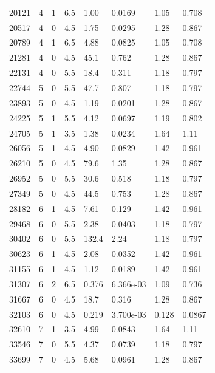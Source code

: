 \documentclass[preview]{standalone}
\begin{document}
{{{\begin{tabular}{L{1.2cm}C{1.2cm} C{0.3cm}C{0.5cm} C{1.4cm}C{1.4cm} C{1.4cm}C{1.4cm}}
  20121  &     4  & 1     & 6.5 &  1.00  & 0.0169  & 1.05 &  0.708   \\ 
  20517  &     4  & 0     & 4.5 &  1.75  & 0.0295  & 1.28 &  0.867   \\ 
  20789  &     4  & 1     & 6.5 &  4.88  & 0.0825  & 1.05 &  0.708   \\ 
  21281  &     4  & 0     & 4.5 &  45.1  & 0.762  & 1.28 &  0.867   \\ 
  22131  &     4  & 0     & 5.5 &  18.4  & 0.311  & 1.18 &  0.797   \\ 
  22744  &     5  & 0     & 5.5 &  47.7  & 0.807  & 1.18 &  0.797   \\ 
  23893  &     5  & 0     & 4.5 &  1.19  & 0.0201  & 1.28 &  0.867   \\ 
  24225  &     5  & 1     & 5.5 &  4.12  & 0.0697  & 1.19 &  0.802   \\ 
  24705  &     5  & 1     & 3.5 &  1.38  & 0.0234  & 1.64 &  1.11   \\ 
  26056  &     5  & 1     & 4.5 &  4.90  & 0.0829  & 1.42 &  0.961   \\ 
  26210  &     5  & 0     & 4.5 &  79.6  & 1.35  & 1.28 &  0.867   \\ 
  26952  &     5  & 0     & 5.5 &  30.6  & 0.518  & 1.18 &  0.797   \\ 
  27349  &     5  & 0     & 4.5 &  44.5  & 0.753  & 1.28 &  0.867   \\ 
  28182  &     6  & 1     & 4.5 &  7.61  & 0.129  & 1.42 &  0.961   \\ 
  29468  &     6  & 0     & 5.5 &  2.38  & 0.0403  & 1.18 &  0.797   \\ 
  30402  &     6  & 0     & 5.5 &  132.4  & 2.24  & 1.18 &  0.797   \\ 
  30623  &     6  & 1     & 4.5 &  2.08  & 0.0352  & 1.42 &  0.961   \\ 
  31155  &     6  & 1     & 4.5 &  1.12  & 0.0189  & 1.42 &  0.961   \\ 
  31307  &     6  & 2     & 6.5 &  0.376  & 6.366e-03  & 1.09 &  0.736   \\ 
  31667  &     6  & 0     & 4.5 &  18.7  & 0.316  & 1.28 &  0.867   \\ 
  32103  &     6  & 0     & 4.5 &  0.219  & 3.700e-03  & 0.128 &  0.0867   \\ 
  32610  &     7  & 1     & 3.5 &  4.99  & 0.0843  & 1.64 &  1.11   \\ 
  33546  &     7  & 0     & 5.5 &  4.37  & 0.0739  & 1.18 &  0.797   \\ 
  33699  &     7  & 0     & 4.5 &  5.68  & 0.0961  & 1.28 &  0.867   \\ 

\end{tabular}}}}
\end{document}
